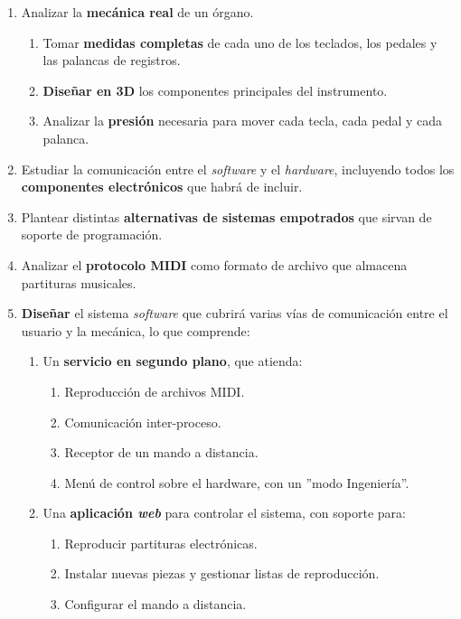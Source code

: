 \begin{enumerate}
	\item Analizar la \textbf{mecánica real} de un órgano.
	
	\begin{enumerate}
		\item Tomar \textbf{medidas completas} de cada uno de los teclados, los pedales y las palancas de registros.
		\item \textbf{Diseñar en 3D} los componentes principales del instrumento.
		\item Analizar la \textbf{presión} necesaria para mover cada tecla, cada pedal y cada palanca.
	\end{enumerate}
	
	\item Estudiar la comunicación entre el \textit{software} y el \textit{hardware}, incluyendo todos los \textbf{componentes electrónicos} que habrá de incluir.
	
	\item Plantear distintas \textbf{alternativas de sistemas empotrados} que sirvan de soporte de programación.
	
	\item Analizar el \textbf{protocolo \acrshort{MIDI}} como formato de archivo que almacena partituras musicales.
	
	\item \textbf{Diseñar} el sistema \textit{software} que cubrirá varias vías de comunicación entre el usuario y la mecánica, lo que comprende:
	
	\begin{enumerate}
		\item Un \textbf{servicio en segundo plano}, que atienda:
		
		\begin{enumerate}
			\item Reproducción de archivos \acrshort{MIDI}.
			\item Comunicación inter-proceso.
			\item Receptor de un mando a distancia.
			\item Menú de control sobre el hardware, con un ''modo Ingeniería''.
		\end{enumerate}
		
		\item Una \textbf{aplicación \textit{web}} para controlar el sistema, con soporte para:
		
		\begin{enumerate}
			\item Reproducir partituras electrónicas.
			\item Instalar nuevas piezas y gestionar listas de reproducción.
			\item Configurar el mando a distancia.
		\end{enumerate}
		

\end{enumerate}
\end{enumerate}
